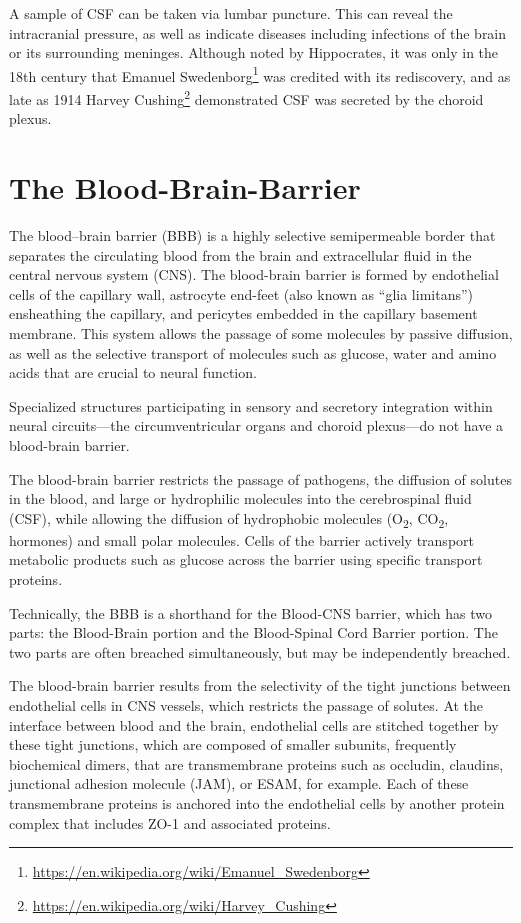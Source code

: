 \documentclass[]{book}
\let\rmarkdownfootnote\footnote%
\def\footnote{\protect\rmarkdownfootnote}
\renewcommand{\href}[2]{#2\footnote{\url{#1}}}
\begin{document}
A sample of CSF can be taken via lumbar puncture. This can reveal the intracranial pressure, as well as indicate diseases including infections of the brain or its surrounding meninges. Although noted by Hippocrates, it was only in the 18th century that \href{https://en.wikipedia.org/wiki/Emanuel_Swedenborg}{Emanuel Swedenborg} was credited with its rediscovery, and as late as 1914 \href{https://en.wikipedia.org/wiki/Harvey_Cushing}{Harvey Cushing} demonstrated CSF was secreted by the choroid plexus.

\hypertarget{the-blood-brain-barrier}{%
\section{The Blood-Brain-Barrier}\label{the-blood-brain-barrier}}

The blood--brain barrier (BBB) is a highly selective semipermeable border that separates the circulating blood from the brain and extracellular fluid in the central nervous system (CNS). The blood-brain barrier is formed by endothelial cells of the capillary wall, astrocyte end-feet (also known as ``glia limitans'') ensheathing the capillary, and pericytes embedded in the capillary basement membrane. This system allows the passage of some molecules by passive diffusion, as well as the selective transport of molecules such as glucose, water and amino acids that are crucial to neural function.

Specialized structures participating in sensory and secretory integration within neural circuits---the circumventricular organs and choroid plexus---do not have a blood-brain barrier.

The blood-brain barrier restricts the passage of pathogens, the diffusion of solutes in the blood, and large or hydrophilic molecules into the cerebrospinal fluid (CSF), while allowing the diffusion of hydrophobic molecules (O\textsubscript{2}, CO\textsubscript{2}, hormones) and small polar molecules. Cells of the barrier actively transport metabolic products such as glucose across the barrier using specific transport proteins.

Technically, the BBB is a shorthand for the Blood-CNS barrier, which has two parts: the Blood-Brain portion and the Blood-Spinal Cord Barrier portion. The two parts are often breached simultaneously, but may be independently breached.

The blood-brain barrier results from the selectivity of the tight junctions between endothelial cells in CNS vessels, which restricts the passage of solutes. At the interface between blood and the brain, endothelial cells are stitched together by these tight junctions, which are composed of smaller subunits, frequently biochemical dimers, that are transmembrane proteins such as occludin, claudins, junctional adhesion molecule (JAM), or ESAM, for example. Each of these transmembrane proteins is anchored into the endothelial cells by another protein complex that includes ZO-1 and associated proteins.
\end{document}
